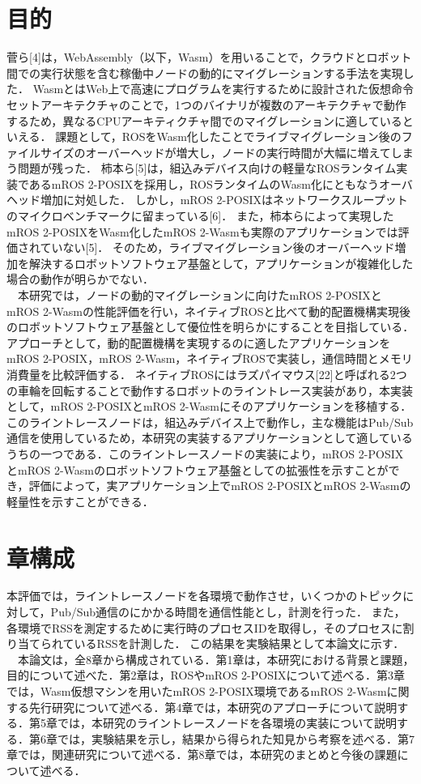 \section{目的}
菅ら[4]は，WebAssembly（以下，Wasm）を用いることで，クラウドとロボット間での実行状態を含む稼働中ノードの動的にマイグレーションする手法を実現した．
WasmとはWeb上で高速にプログラムを実行するために設計された仮想命令セットアーキテクチャのことで，1つのバイナリが複数のアーキテクチャで動作するため，異なるCPUアーキティクチャ間でのマイグレーションに適しているといえる．
課題として，ROSをWasm化したことでライブマイグレーション後のファイルサイズのオーバーヘッドが増大し，ノードの実行時間が大幅に増えてしまう問題が残った．
柿本ら[5]は，組込みデバイス向けの軽量なROSランタイム実装であるmROS 2-POSIXを採用し，ROSランタイムのWasm化にともなうオーバヘッド増加に対処した．
しかし，mROS 2-POSIXはネットワークスループットのマイクロベンチマークに留まっている[6]．
また，柿本らによって実現したmROS 2-POSIXをWasm化したmROS 2-Wasmも実際のアプリケーションでは評価されていない[5]．
そのため，ライブマイグレーション後のオーバーヘッド増加を解決するロボットソフトウェア基盤として，アプリケーションが複雑化した場合の動作が明らかでない．
\\　本研究では，ノードの動的マイグレーションに向けたmROS 2-POSIXとmROS 2-Wasmの性能評価を行い，ネイティブROSと比べて動的配置機構実現後のロボットソフトウェア基盤として優位性を明らかにすることを目指している．
アプローチとして，動的配置機構を実現するのに適したアプリケーションをmROS 2-POSIX，mROS 2-Wasm，ネイティブROSで実装し，通信時間とメモリ消費量を比較評価する．
ネイティブROSにはラズパイマウス[22]と呼ばれる2つの車輪を回転することで動作するロボットのライントレース実装があり，本実装として，mROS 2-POSIXとmROS 2-Wasmにそのアプリケーションを移植する．
このライントレースノードは，組込みデバイス上で動作し，主な機能はPub/Sub通信を使用しているため，本研究の実装するアプリケーションとして適しているうちの一つである．このライントレースノードの実装により，mROS 2-POSIXとmROS 2-Wasmのロボットソフトウェア基盤としての拡張性を示すことができ，評価によって，実アプリケーション上でmROS 2-POSIXとmROS 2-Wasmの軽量性を示すことができる．
\section{章構成}
本評価では，ライントレースノードを各環境で動作させ，いくつかのトピックに対して，Pub/Sub通信のにかかる時間を通信性能とし，計測を行った．
また，各環境でRSSを測定するために実行時のプロセスIDを取得し，そのプロセスに割り当てられているRSSを計測した．
この結果を実験結果として本論文に示す．
\\　本論文は，全8章から構成されている．第1章は，本研究における背景と課題，目的について述べた．第2章は，ROSやmROS 2-POSIXについて述べる．第3章では，Wasm仮想マシンを用いたmROS 2-POSIX環境であるmROS 2-Wasmに関する先行研究について述べる．第4章では，本研究のアプローチについて説明する．第5章では，本研究のライントレースノードを各環境の実装について説明する．第6章では，実験結果を示し，結果から得られた知見から考察を述べる．第7章では，関連研究について述べる．第8章では，本研究のまとめと今後の課題について述べる．
